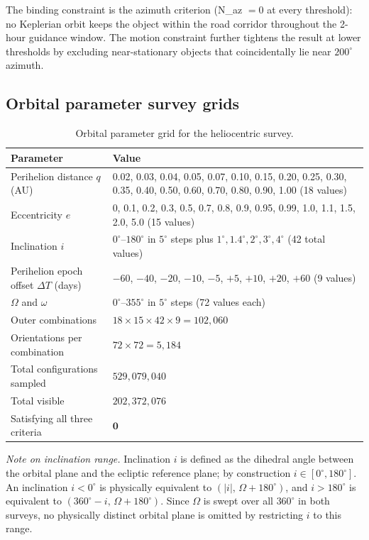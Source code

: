 \documentclass[11pt,a4paper]{article}
\begin{document}
\noindent The binding constraint is the azimuth criterion (N\_az $= 0$ at
every threshold): no Keplerian orbit keeps the object within the road
corridor throughout the 2-hour guidance window. The motion constraint
further tightens the result at lower thresholds by excluding near-stationary
objects that coincidentally lie near $200^\circ$ azimuth.

\subsection{Orbital parameter survey grids}

\begin{table}[h]
  \caption{Orbital parameter grid for the heliocentric survey.}
  \label{tab:hgrid}
  \centering
  \small
  \begin{tabular}{@{}lp{10cm}@{}}
    \toprule
    Parameter & Value \\
    \midrule
    Perihelion distance $q$ (AU) & 0.02, 0.03, 0.04, 0.05, 0.07, 0.10, 0.15, 0.20, 0.25, 0.30, 0.35, 0.40, 0.50, 0.60, 0.70, 0.80, 0.90, 1.00 (18 values) \\
    Eccentricity $e$ & 0, 0.1, 0.2, 0.3, 0.5, 0.7, 0.8, 0.9, 0.95, 0.99, 1.0, 1.1, 1.5, 2.0, 5.0 (15 values) \\
    Inclination $i$ & $0^\circ$--$180^\circ$ in $5^\circ$ steps plus $1^\circ,1.4^\circ,2^\circ,3^\circ,4^\circ$ (42 total values) \\
    Perihelion epoch offset $\Delta T$ (days) & $-60$, $-40$, $-20$, $-10$, $-5$, $+5$, $+10$, $+20$, $+60$ (9 values) \\
    $\Omega$ and $\omega$ & $0^\circ$--$355^\circ$ in $5^\circ$ steps (72 values each) \\
    \midrule
    Outer combinations & $18 \times 15 \times 42 \times 9 = 102{,}060$ \\
    Orientations per combination & $72 \times 72 = 5{,}184$ \\
    Total configurations sampled & $529{,}079{,}040$ \\
    Total visible & $202{,}372{,}076$ \\
    Satisfying all three criteria & $\mathbf{0}$ \\
    \bottomrule
  \end{tabular}

  \smallskip
  {\small\textit{Note on inclination range.} Inclination $i$ is defined as the
  dihedral angle between the orbital plane and the ecliptic reference plane;
  by construction $i\in[0^\circ,180^\circ]$. An inclination $i<0^\circ$ is
  physically equivalent to $(|i|,\,\Omega+180^\circ)$, and $i>180^\circ$ is
  equivalent to $(360^\circ-i,\,\Omega+180^\circ)$. Since $\Omega$ is swept
  over all $360^\circ$ in both surveys, no physically distinct orbital plane
  is omitted by restricting $i$ to this range.}
\end{table}
\end{document}
